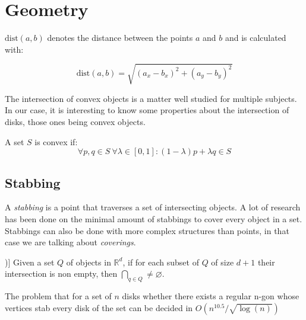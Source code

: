 \section{Geometry}
\label{sec:geom}

\begin{defn}
  $\text{dist}(a,b)$ denotes the distance between the points $a$ and $b$ and is calculated with:

  $$\text{dist}(a,b) = \sqrt{(a_x - b_x)^2 + (a_y - b_y)^2}$$
\end{defn}

The intersection of convex objects is a matter well studied for multiple
subjects. In our case, it is interesting to know some properties about
the intersection of disks, those ones being convex objects.

A set $S$ is convex if:
$$\forall p,q \in S\  \forall \lambda \in [0,1]: (1-\lambda)p + \lambda q \in S$$

\subsection{Stabbing}
A \textit{stabbing} is a point that traverses a set of intersecting objects. A lot of
research has been done \cite{schlipf2013stabbing} on the minimal amount of stabbings to
cover every object in a set. Stabbings can also be done with more complex structures
than points, in that case we are talking about \textit{coverings}.

\begin{theorem}[Helly (\cite[Helly1923175])]
  Given a set $Q$ of objects in $\mathbb{R}^d$, if for each subset of $Q$ of
  size $d+1$ their intersection is non empty, then $\bigcap_{q \in Q} \neq
  \varnothing$. \cite{Helly1923175}
\end{theorem}

\begin{theorem}
  The problem that for a set of $n$ disks whether there exists a regular n-gon
  whose vertices stab every disk of the set can be decided in $O(n^{10.5} / \sqrt{\log(n)})$ \cite{schlipf2013stabbing}
\end{theorem}

